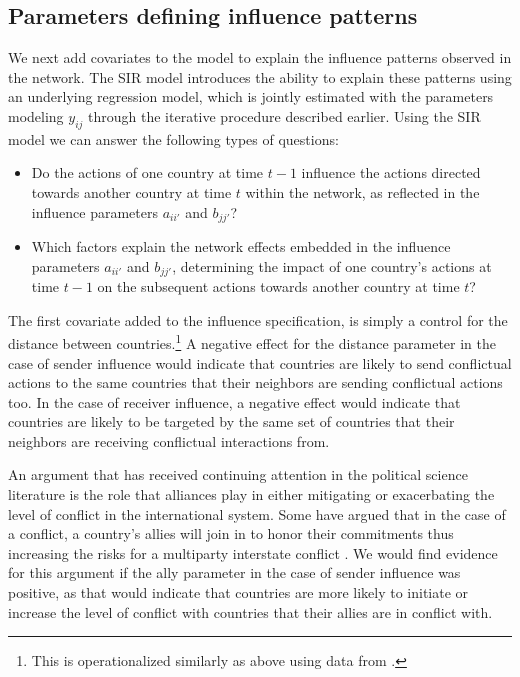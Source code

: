 \subsection*{Parameters defining influence patterns}

We next add covariates to the model to explain the influence patterns observed in the network. The SIR model introduces the ability to explain these patterns using an underlying regression model, which is jointly estimated with the parameters modeling $y_{ij}$ through the iterative procedure described earlier. Using the SIR model we can answer the following types of questions:

\begin{itemize}
    \item Do the actions of one country at time $t-1$ influence the actions directed towards another country at time $t$ within the network, as reflected in the influence parameters $a_{ii'}$ and $b_{jj'}$?
	\item Which factors explain the network effects embedded in the influence parameters $a_{ii'}$ and $b_{jj'}$, determining the impact of one country's actions at time $t-1$ on the subsequent actions towards another country at time $t$?
\end{itemize}

The first covariate added to the influence specification, is simply a control for the distance between countries.\footnote{This is operationalized similarly as above using data from .} A negative effect for the distance parameter in the case of sender influence would indicate that countries are likely to send conflictual actions to the same countries that their neighbors are sending conflictual actions too. In the case of receiver influence, a negative effect would indicate that countries are likely to be targeted by the same set of countries that their neighbors are receiving conflictual interactions from.

An argument that has received continuing attention in the political science literature is the role that alliances play in either mitigating or exacerbating the level of conflict in the international system. Some have argued that in the case of a conflict, a country's allies will join in to honor their commitments thus increasing the risks for a multiparty interstate conflict \citep{snyder:1984,leeds:2003,vasquez:rundlett:2016}. We would find evidence for this argument if the ally parameter in the case of sender influence was positive, as that would indicate that countries are more likely to initiate or increase the level of conflict with countries that their allies are in conflict with.

